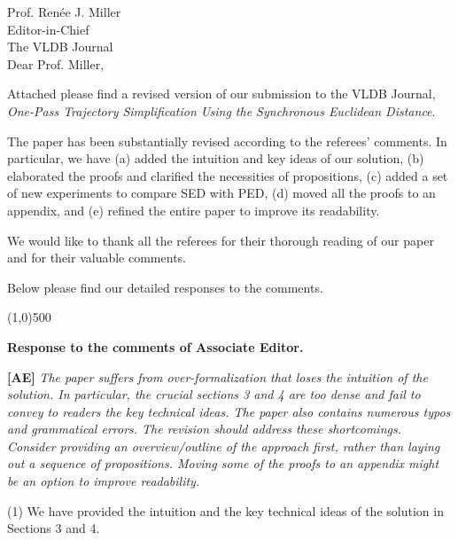 \documentclass{letter}
\begin{document}
Prof. {Ren{\'{e}}e J. Miller} \\
Editor-in-Chief		\\
The VLDB Journal	\\



Dear Prof. Miller,

Attached please find a revised version of our submission to
the VLDB Journal, \emph{One-Pass Trajectory Simplification Using the Synchronous Euclidean Distance}.


The paper has been substantially revised according to the referees' comments. In particular, we have (a) added the intuition and key ideas of our solution, (b) elaborated the proofs and clarified the necessities of propositions, (c) added a set of new experiments to compare SED with PED, (d) moved all the proofs to an appendix, and (e) refined the entire paper to improve its readability.

We would like to thank all the referees for their thorough reading of our paper and for their valuable comments.

Below please find our detailed responses to the comments.


\line(1,0){500}

\textbf{Response to the comments of Associate Editor.}

\textbf{[AE]} \emph{The paper suffers from over-formalization that loses the intuition of the solution. In particular, the crucial sections 3 and 4 are too dense and fail to convey to readers the key technical ideas. The paper also contains numerous typos and grammatical errors. The revision should address these shortcomings. Consider providing an overview/outline of the approach first, rather than laying out a sequence of propositions. Moving some of the proofs to an appendix might be an option to improve readability. }

(1) We have provided the intuition and the key technical ideas of the solution in Sections 3 and 4.

\end{document}
